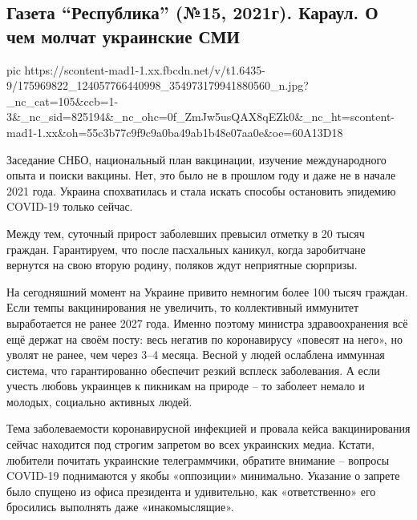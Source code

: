  
 
 
 
 

\subsection{Газета \enquote{Республика} (№15, 2021г).  Караул.  О чем молчат украинские СМИ}
\label{sec:19_04_2021.fb.respublikalnr.1.rossia_vaccina}


\ifcmt
  pic https://scontent-mad1-1.xx.fbcdn.net/v/t1.6435-9/175969822_124057766440998_354973179941880560_n.jpg?_nc_cat=105&ccb=1-3&_nc_sid=825194&_nc_ohc=0f_ZmJw5usQAX8qEZk0&_nc_ht=scontent-mad1-1.xx&oh=55c3b77c9f9c9a0ba49ab1b48e07aa0e&oe=60A13D18
\fi


Заседание СНБО, национальный план вакцинации, изучение международного опыта и
поиски вакцины. Нет, это было не в прошлом году и даже не в начале 2021 года.
Украина спохватилась и стала искать способы остановить эпидемию COVID-19 только
сейчас. 

Между тем, суточный прирост заболевших превысил отметку в 20 тысяч граждан.
Гарантируем, что после пасхальных каникул, когда заробитчане вернутся на свою
вторую родину, поляков ждут неприятные сюрпризы.

На сегодняшний момент на Украине привито немногим более 100 тысяч граждан. Если
темпы вакцинирования не увеличить, то коллективный иммунитет выработается не
ранее 2027 года. Именно поэтому министра здравоохранения всё ещё держат на
своём посту: весь негатив по коронавирусу «повесят на него», но уволят не
ранее, чем через 3–4 месяца. Весной у людей ослаблена иммунная система, что
гарантированно обеспечит резкий всплеск заболевания. А если учесть любовь
украинцев к пикникам на природе – то заболеет немало и молодых, социально
активных людей. 

Тема заболеваемости коронавирусной инфекцией и провала кейса вакцинирования
сейчас находится под строгим запретом во всех украинских медиа. Кстати,
любители почитать украинские телеграммчики, обратите внимание – вопросы
COVID-19 поднимаются у якобы «оппозиции» минимально. Указание о запрете было
спущено из офиса президента и удивительно, как «ответственно» его бросились
выполнять даже «инакомыслящие». 

